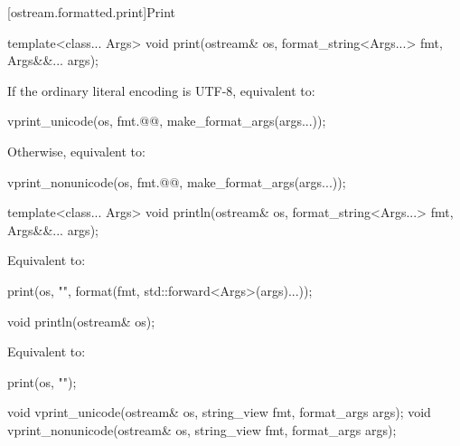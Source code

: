 [ostream.formatted.print]{Print}

%
\begin{itemdecl}
template<class... Args>
  void print(ostream& os, format_string<Args...> fmt, Args&&... args);
\end{itemdecl}

\begin{itemdescr}
\pnum
\effects
If the ordinary literal encoding is UTF-8, equivalent to:
\begin{codeblock}
vprint_unicode(os, fmt.@@, make_format_args(args...));
\end{codeblock}
Otherwise, equivalent to:
\begin{codeblock}
vprint_nonunicode(os, fmt.@@, make_format_args(args...));
\end{codeblock}
\end{itemdescr}

%
\begin{itemdecl}
template<class... Args>
  void println(ostream& os, format_string<Args...> fmt, Args&&... args);
\end{itemdecl}

\begin{itemdescr}
\pnum
\effects
Equivalent to:
\begin{codeblock}
print(os, "{}\n", format(fmt, std::forward<Args>(args)...));
\end{codeblock}
\end{itemdescr}

%
\begin{itemdecl}
void println(ostream& os);
\end{itemdecl}

\begin{itemdescr}
\pnum
\effects
Equivalent to:
\begin{codeblock}
print(os, "\n");
\end{codeblock}
\end{itemdescr}

%
%
\begin{itemdecl}
void vprint_unicode(ostream& os, string_view fmt, format_args args);
void vprint_nonunicode(ostream& os, string_view fmt, format_args args);
\end{itemdecl}

